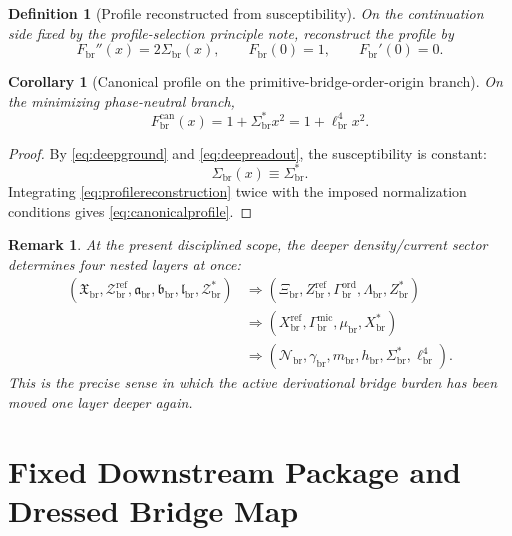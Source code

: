 \documentclass[11pt]{article}
\newcommand{\CurvScale}{\ell_{\mathrm{br}}}
\newcommand{\CurvProfile}{F_{\mathrm{br}}}
\newcommand{\CurvProfileCan}{F_{\mathrm{br}}^{\mathrm{can}}}
\newcommand{\RespSus}{\Sigma_{\mathrm{br}}}
\newcommand{\RespSusEq}{\Sigma_{\mathrm{br}}^{\ast}}
\newcommand{\RespNorm}{\mathcal N_{\mathrm{br}}}
\newcommand{\RespFluxCoeff}{\gamma_{\mathrm{br}}}
\newcommand{\RespGap}{m_{\mathrm{br}}}
\newcommand{\RespBias}{h_{\mathrm{br}}}
\newcommand{\RespMicroEq}{X_{\mathrm{br}}^{\ast}}
\newcommand{\RespMicroRef}{X_{\mathrm{br}}^{\mathrm{ref}}}
\newcommand{\RespMicroFluxCoeff}{\Gamma_{\mathrm{br}}^{\mathrm{mic}}}
\newcommand{\RespMicroGap}{\mu_{\mathrm{br}}}
\newcommand{\RespOrderRef}{Z_{\mathrm{br}}^{\mathrm{ref}}}
\newcommand{\RespOrderEq}{Z_{\mathrm{br}}^{\ast}}
\newcommand{\RespOrderReadout}{\Xi_{\mathrm{br}}}
\newcommand{\RespOrderStiff}{\Gamma_{\mathrm{br}}^{\mathrm{ord}}}
\newcommand{\RespOrderQuartic}{\Lambda_{\mathrm{br}}}
\newcommand{\RespDeepDensityRef}{\mathcal Z_{\mathrm{br}}^{\mathrm{ref}}}
\newcommand{\RespDeepDensityEq}{\mathcal Z_{\mathrm{br}}^{\ast}}
\newcommand{\RespDeepReadout}{\mathfrak X_{\mathrm{br}}}
\newcommand{\RespDeepTrack}{\mathfrak a_{\mathrm{br}}}
\newcommand{\RespDeepRelax}{\mathfrak b_{\mathrm{br}}}
\newcommand{\RespDeepWell}{\mathfrak l_{\mathrm{br}}}
\newtheorem{definition}{Definition}
\newtheorem{remark}{Remark}
\newtheorem{corollary}{Corollary}
\begin{document}
\begin{definition}[Profile reconstructed from susceptibility]
\label{def:profilereconstruction}
On the continuation side fixed by the profile-selection principle note, reconstruct the profile by
\begin{equation}
\CurvProfile''(x)=2\RespSus(x),
\qquad
\CurvProfile(0)=1,
\qquad
\CurvProfile'(0)=0.
\label{eq:profilereconstruction}
\end{equation}
\end{definition}

\begin{corollary}[Canonical profile on the primitive-bridge-order-origin branch]
\label{cor:canonicalprofile}
On the minimizing phase-neutral branch,
\begin{equation}
\CurvProfileCan(x)=1+\RespSusEq x^2=1+\CurvScale^4x^2.
\label{eq:canonicalprofile}
\end{equation}
\end{corollary}

\begin{proof}
By \eqref{eq:deepground} and \eqref{eq:deepreadout}, the susceptibility is constant:
\[
\RespSus(x)\equiv \RespSusEq.
\]
Integrating \eqref{eq:profilereconstruction} twice with the imposed normalization conditions gives \eqref{eq:canonicalprofile}.
\end{proof}

\begin{remark}
At the present disciplined scope, the deeper density/current sector determines four nested layers at once:
\begin{align*}
(\RespDeepReadout,\RespDeepDensityRef,\RespDeepTrack,\RespDeepRelax,\RespDeepWell,\RespDeepDensityEq)
&\Longrightarrow
(\RespOrderReadout,\RespOrderRef,\RespOrderStiff,\RespOrderQuartic,\RespOrderEq)
\nonumber\\
&\Longrightarrow
(\RespMicroRef,\RespMicroFluxCoeff,\RespMicroGap,\RespMicroEq)
\nonumber\\
&\Longrightarrow
(\RespNorm,\RespFluxCoeff,\RespGap,\RespBias,\RespSusEq,\CurvScale^4).
\end{align*}
This is the precise sense in which the active derivational bridge burden has been moved one layer deeper again.
\end{remark}

\section{Fixed Downstream Package and Dressed Bridge Map}
\end{document}
